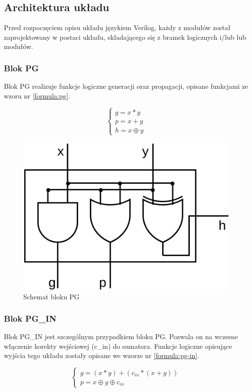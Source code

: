 \documentclass[12pt,oneside,reqno]{article}
\begin{document}
\subsection{Architektura układu}

Przed rozpoczęciem opisu układu językiem Verilog, każdy z modułów został zaprojektowany w postaci układu, składającego się z bramek logicznych i/lub lub modułów. 

\subsubsection{Blok PG} 
\label{section:pg-block}

Blok PG realizuje funkcje logiczne generacji oraz propagacji, opisane funkcjami ze wzoru nr \ref{formula:pg}.

\begin{equation}
    \begin{cases}
      g = x*y\\
      p = x+y\\
      h = x\oplus y
    \end{cases}
    \label{formula:pg}
\end{equation}

\begin{figure}[H]
\centering
\includegraphics[width=0.5\linewidth]{diagrams/pg_block.png}
\caption{Schemat bloku PG}\label{fig:diagram_pg}
\end{figure}

\subsubsection{Blok PG\_IN}
\label{section:pg-in-block}
Blok PG\_IN jest szczególnym przypadkiem bloku PG. Pozwala on na wczesne włączenie korekty wejściowej (c\_in) do sumatora. Funkcje logiczne opisujące wyjścia tego układu zostały opisane we wzorze nr \ref{formula:pg-in}.

\begin{equation}
    \begin{cases}
      g = (x * y) + (c_{in} * (x + y))\\
      p = x\oplus y\oplus c_{in}
    \end{cases}       
    \label{formula:pg-in}
\end{equation}
\end{document}

